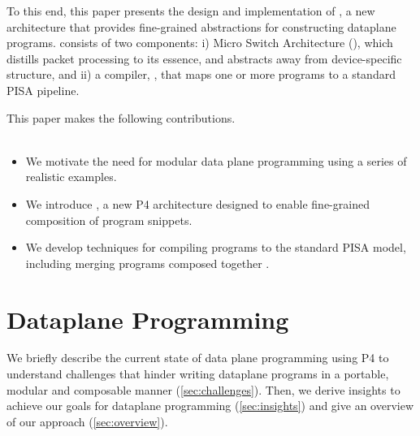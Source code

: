 \documentclass[letterpaper,twocolumn,10pt]{article}
\begin{document}
To this end, this paper presents the design and implementation of
\ulang, a new architecture that provides fine-grained abstractions for
constructing dataplane programs. \ulang consists of two components: i)
Micro Switch Architecture (\uarch), which distills packet processing
to its essence, and abstracts away from device-specific structure, and
ii) a compiler, \ucomp, that maps one or more \uarch programs to a
standard PISA pipeline.
\\

This paper makes the following contributions.\\
\\
\begin{itemize}
\item We motivate the need for modular data plane programming using a
  series of realistic examples.
\item We introduce \uarch, a new P4 architecture designed to enable
  fine-grained composition of program snippets.
\item We develop techniques for compiling \uarch programs to the
  standard PISA model, including merging programs composed together 
  .
\end{itemize}





\section{Dataplane Programming}
\label{sec:background}

We briefly describe the current state of data plane programming using
P4 to understand challenges that hinder writing dataplane programs in
a portable, modular and composable manner (\cref{sec:challenges}).
Then, we derive insights to achieve our goals for dataplane
programming (\cref{sec:insights}) and give an overview of our approach
(\cref{sec:overview}).
\end{document}
